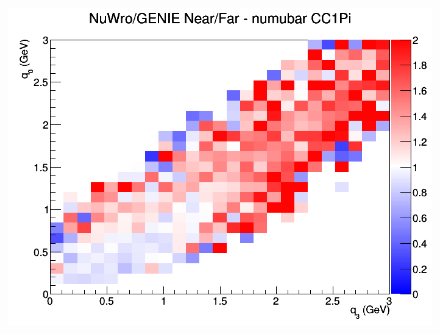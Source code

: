 \documentclass[12pt]{article}
\begin{document}
\begin{figure}[h]
\endminipage
{}
\includegraphics[width=\linewidth]{eff_q0_q3/GAr/ratios/CC1Pi_NuWro_GENIE_numubar_NF_q3_q0.png}
\endminipage
\newline
\end{figure}
\clearpage
\end{document}
